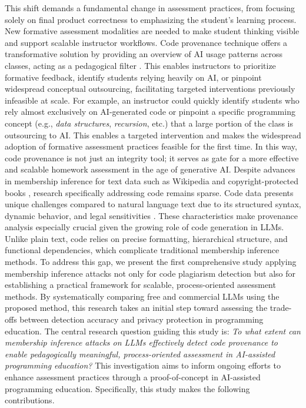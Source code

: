 \documentclass[runningheads]{llncs}
\begin{document}
This shift demands a fundamental change in assessment practices, from focusing solely on final product correctness to emphasizing the student’s learning process. New formative assessment modalities are needed to make student thinking visible and support scalable instructor workflows. Code provenance technique offers a transformative solution by providing an overview of AI usage patterns across classes, acting as a pedagogical filter \cite{r28}. This enables instructors to prioritize formative feedback, identify students relying heavily on AI, or pinpoint widespread conceptual outsourcing, facilitating targeted interventions previously infeasible at scale. For example, an instructor could quickly identify students who rely almost exclusively on AI-generated code or pinpoint a specific programming concept (e.g., \textit{data structures}, \textit{recursion}, etc.) that a large portion of the class is outsourcing to AI. This enables a targeted intervention and makes the widespread adoption of formative assessment practices feasible for the first time. In this way, code provenance is not just an integrity tool; it serves as gate for a more effective and scalable homework assessment in the age of generative AI. Despite advances in membership inference for text data such as Wikipedia and copyright-protected books \cite{r1}, research specifically addressing code remains sparse. Code data presents unique challenges compared to natural language text due to its structured syntax, dynamic behavior, and legal sensitivities \cite{r17}. These characteristics make provenance analysis especially crucial given the growing role of code generation in LLMs. Unlike plain text, code relies on precise formatting, hierarchical structure, and functional dependencies, which complicate traditional membership inference methods. To address this gap, we present the first comprehensive study applying membership inference attacks not only for code plagiarism detection but also for establishing a practical framework for scalable, process-oriented assessment methods. By systematically comparing free and commercial LLMs using the proposed method, this research takes an initial step toward assessing the trade-offs between detection accuracy and privacy protection in programming education. The central research question guiding this study is: \textit{To what extent can membership inference attacks on LLMs effectively detect code provenance to enable pedagogically meaningful, process-oriented assessment in AI-assisted programming education?} This investigation aims to inform ongoing efforts to enhance assessment practices through a proof-of-concept in AI-assisted programming education. Specifically, this study makes the following contributions.
\end{document}
